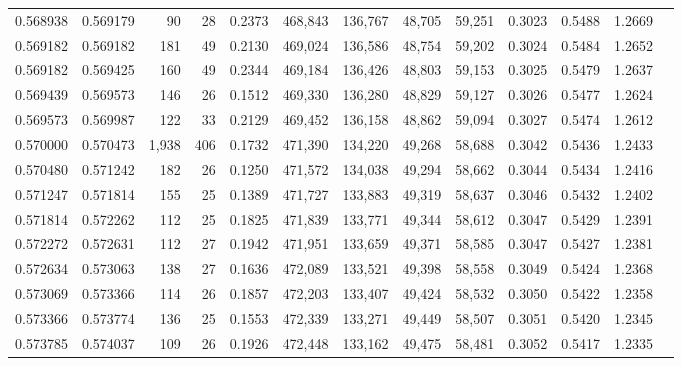 \begin{tabular}{rrrrrrrrrrrrr}
0.568938 & 0.569179 &    90 &  28 &                                     0.2373 & 468,843 & 136,767 &  48,705 &  59,251 & 0.3023 & 0.5488 & 1.2669 \\
0.569182 & 0.569182 &   181 &  49 &                                     0.2130 & 469,024 & 136,586 &  48,754 &  59,202 & 0.3024 & 0.5484 & 1.2652 \\
0.569182 & 0.569425 &   160 &  49 &                                     0.2344 & 469,184 & 136,426 &  48,803 &  59,153 & 0.3025 & 0.5479 & 1.2637 \\
0.569439 & 0.569573 &   146 &  26 &                                     0.1512 & 469,330 & 136,280 &  48,829 &  59,127 & 0.3026 & 0.5477 & 1.2624 \\
0.569573 & 0.569987 &   122 &  33 &                                     0.2129 & 469,452 & 136,158 &  48,862 &  59,094 & 0.3027 & 0.5474 & 1.2612 \\
0.570000 & 0.570473 & 1,938 & 406 &                                     0.1732 & 471,390 & 134,220 &  49,268 &  58,688 & 0.3042 & 0.5436 & 1.2433 \\
0.570480 & 0.571242 &   182 &  26 &                                     0.1250 & 471,572 & 134,038 &  49,294 &  58,662 & 0.3044 & 0.5434 & 1.2416 \\
0.571247 & 0.571814 &   155 &  25 &                                     0.1389 & 471,727 & 133,883 &  49,319 &  58,637 & 0.3046 & 0.5432 & 1.2402 \\
0.571814 & 0.572262 &   112 &  25 &                                     0.1825 & 471,839 & 133,771 &  49,344 &  58,612 & 0.3047 & 0.5429 & 1.2391 \\
0.572272 & 0.572631 &   112 &  27 &                                     0.1942 & 471,951 & 133,659 &  49,371 &  58,585 & 0.3047 & 0.5427 & 1.2381 \\
0.572634 & 0.573063 &   138 &  27 &                                     0.1636 & 472,089 & 133,521 &  49,398 &  58,558 & 0.3049 & 0.5424 & 1.2368 \\
0.573069 & 0.573366 &   114 &  26 &                                     0.1857 & 472,203 & 133,407 &  49,424 &  58,532 & 0.3050 & 0.5422 & 1.2358 \\
0.573366 & 0.573774 &   136 &  25 &                                     0.1553 & 472,339 & 133,271 &  49,449 &  58,507 & 0.3051 & 0.5420 & 1.2345 \\
0.573785 & 0.574037 &   109 &  26 &                                     0.1926 & 472,448 & 133,162 &  49,475 &  58,481 & 0.3052 & 0.5417 & 1.2335 \\

\end{tabular}
